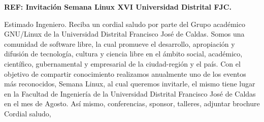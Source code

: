 \textbf{REF: Invitación Semana Linux XVI Universidad Distrital FJC.}

Estimado Ingeniero. Reciba un cordial saludo por parte del Grupo académico GNU/Linux de la Universidad Distrital Francisco José de Caldas.
Somos una comunidad de software libre, la cual promueve el desarrollo, apropiación y difusión de tecnología, cultura y ciencia libre en el ámbito social, académico, científico, gubernamental y empresarial de la ciudad-región y el país.
Con el objetivo de compartir conocimiento realizamos anualmente uno de los eventos más reconocidos, Semana Linux, al cual queremos invitarle, el mismo tiene lugar en la Facultad de Ingeniería de la Universidad Distrital Francisco José de Caldas en  el mes de Agosto.
Así mismo, conferencias, sponsor, talleres, adjuntar brochure
Cordial saludo,